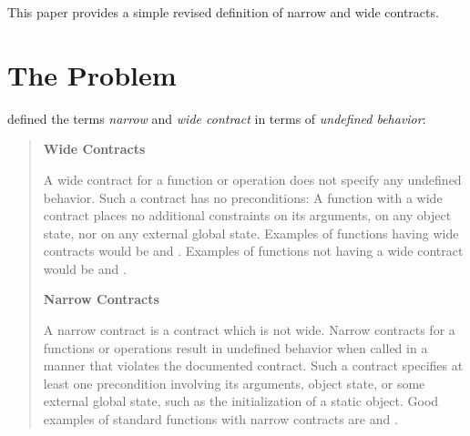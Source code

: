 \newcommand\wgTitle{Redefining \emph{narrow contract}}
\newcommand\wgName{Matthias Kretz <m.kretz@gsi.de>}
\newcommand\wgDocumentNumber{D4011R1}
\newcommand\wgGroup{EWG}

\usepackage{mymacros}
\usepackage{wg21}
\setcounter{tocdepth}{2} %
\hypersetup{bookmarksdepth=5}
\usepackage{changelog}
\usepackage{underscore}
\usepackage{multirow}



\newcommand\wglink[1]{\href{https://wg21.link/#1}{#1}}

\renewcommand{\lst}[1]{Listing~\ref{#1}}
\renewcommand{\sect}[1]{Section~\ref{#1}}
\renewcommand{\ttref}[1]{Tony~Table~\ref{#1}}
\renewcommand{\tabref}[1]{Table~\ref{#1}}


\begin{wgTitlepage}
  This paper provides a simple revised definition of narrow and wide contracts.
\end{wgTitlepage}

\pagestyle{scrheadings}




\section{The Problem}

\textcite{N3248} defined the terms \emph{narrow} and \emph{wide contract} in terms of
\emph{undefined behavior}:

\begin{quote}
  \textbf{Wide Contracts}

  A wide contract for a function or operation does not specify any undefined behavior.
  Such a contract has no preconditions: A function with a wide contract places no additional
  constraints on its arguments, on any object state, nor on any external global state.
  Examples of functions having wide contracts would be  and
  .
  Examples of functions not having a wide contract would be  and
  .

  \textbf{Narrow Contracts}

  A narrow contract is a contract which is not wide.
  Narrow contracts for a functions or operations result in undefined behavior when called in a
  manner that violates the documented contract.
  Such a contract specifies at least one precondition involving its arguments, object state, or
  some external global state, such as the initialization of a static object.
  Good examples of standard functions with narrow contracts are  and
  .
\end{quote}

